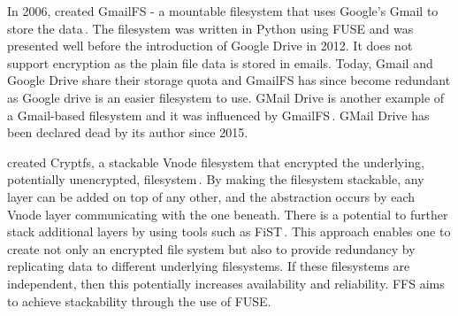 In 2006, \citeauthor{jonesGoogleHackUse2006} created GmailFS - a mountable filesystem that uses Google's Gmail to store the data\,\cite{jonesGoogleHackUse2006, jonesGmailFilesystemImplementation2006}. The filesystem was written in Python using FUSE and was presented well before the introduction of Google Drive in 2012. It does not support encryption as the plain file data is stored in emails. Today, Gmail and Google Drive share their storage quota and GmailFS has since become redundant as Google drive is an easier filesystem to use. GMail Drive is another example of a Gmail-based filesystem and it was influenced by GmailFS\,\cite{viksoeViksoeDkGMail2004}. GMail Drive has been declared dead by its author since 2015.

\citeauthor{badulescuCryptfsStackableVnode1998} created Cryptfs, a stackable Vnode filesystem that encrypted the underlying, potentially unencrypted, filesystem\,\cite{badulescuCryptfsStackableVnode1998}. By making the filesystem stackable, any layer can be added on top of any other, and the abstraction occurs by each Vnode layer communicating with the one beneath. There is a potential to further stack additional layers by using tools such as FiST\,\cite{FiSTStackableFile}. This approach enables one to create not only an encrypted file system but also to provide redundancy by replicating data to different underlying filesystems. If these filesystems are independent, then this potentially increases availability and reliability. FFS aims to achieve stackability through the use of FUSE. 
